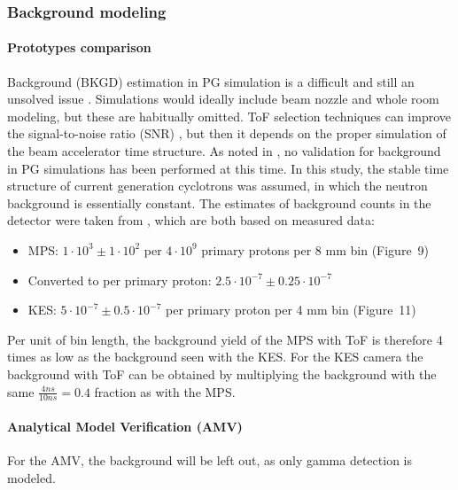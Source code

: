 \documentclass[a4paper,english,12pt]{article}
\begin{document}
\subsubsection{Background modeling}

\paragraph{Prototypes comparison}

Background (BKGD) estimation in PG simulation is a difficult and still an unsolved issue \citep{Huisman2016,Sterpin2015,Pinto2014a,Perali2014}. Simulations would ideally include beam nozzle and whole room modeling, but these are habitually omitted. ToF selection techniques can improve the signal-to-noise ratio (SNR) \citep{Testa2008,Roellinghoff2014a}, but then it depends on the proper simulation of the beam accelerator time structure. As noted in \cite{Huisman2016}, no validation for background in PG simulations has been performed at this time. In this study, the stable time structure of current generation cyclotrons was assumed, in which the neutron background is essentially constant. The estimates of background counts in the detector were taken from \cite{Pinto2014a,Perali2014}, which are both based on measured data:

\begin{itemize}[noitemsep]
\item MPS: \cite{Pinto2014a} $1 \cdot 10^{3} \pm 1 \cdot 10^{2}$ per $4\cdot10^9$ primary protons per 8 mm bin (Figure~9)
\item[] Converted to per primary proton: $2.5 \cdot 10^{-7} \pm 0.25 \cdot 10^{-7}$
\item KES: \cite{Perali2014} $5 \cdot 10^{-7} \pm 0.5 \cdot 10^{-7}$ per primary proton per 4 mm bin (Figure~11)
\end{itemize}

Per unit of bin length, the background yield of the MPS with ToF is therefore 4 times as low as the background seen with the KES. For the KES camera the background with ToF can be obtained by multiplying the background with the same $\frac{4 ns}{10 ns} = 0.4$ fraction as with the MPS. 

\paragraph{Analytical Model Verification (AMV)}

For the AMV, the background will be left out, as only gamma detection is modeled.
\end{document}
